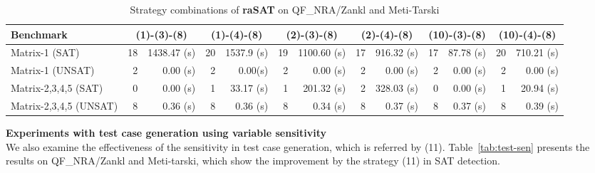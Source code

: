 \documentclass[runningheads,a4paper,oribibl]{llncs}
\begin{document}
\begin{table}[hbt]
{\begin{tabular}{ | l | r | r | r | r  | r | r | r | r | r | r |r | r |}
\\
\hline
\hline
    \multicolumn{1}{|l|}{Benchmark} & 
    \multicolumn{2}{c|}{(1)-(3)-(8)} & \multicolumn{2}{c|}{(1)-(4)-(8)} & 
    \multicolumn{2}{c|}{(2)-(3)-(8)} & \multicolumn{2}{c|}{(2)-(4)-(8)} & 
    \multicolumn{2}{c|}{(10)-(3)-(8)} & \multicolumn{2}{c|}{(10)-(4)-(8)} \\
\hline
 Matrix-1 (SAT) & 18 & 1438.47 (s) & 20 & 1537.9 (s)& 19 & 1100.60 (s)& 17 & 916.32 (s)& 17 & 87.78 (s)& 20 & 710.21 (s)
\\
\hline
 Matrix-1 (UNSAT) & 2 & 0.00 (s)& 2 & 0.00(s) & 2 & 0.00 (s)& 2 & 0.00 (s)& 2 & 0.00 (s)& 2 & 0.00 (s)
\\
\hline
 Matrix-2,3,4,5 (SAT) & 0 & 0.00 (s)& 1 & 33.17 (s)& 1 & 201.32 (s)& 2 & 328.03 (s)& 0 & 0.00 (s)& 1 & 20.94 (s)
\\
\hline
 Matrix-2,3,4,5 (UNSAT) & 8 & 0.36 (s)& 8 & 0.36 (s)& 8 & 0.34 (s)& 8 & 0.37 (s)& 8 & 0.37 (s)& 8 & 0.39 (s)
\\
\hline
\end{tabular}
}
\bigskip
{}
\medskip
\caption{Strategy combinations of {\bf raSAT} on QF\_NRA/Zankl and Meti-Tarski} 
\label{tab:rasat-experiments}
\end{table}
\vspace{-0.5cm}


\noindent
{\bf Experiments with test case generation using variable sensitivity} \\
%
We also examine the effectiveness of the sensitivity in test case generation, 
which is referred by (11).
Table~\ref{tab:test-sen} presents the results on QF\_NRA/Zankl and Meti-tarski, 
which show the improvement by the strategy (11) in SAT detection. 
\end{document}
